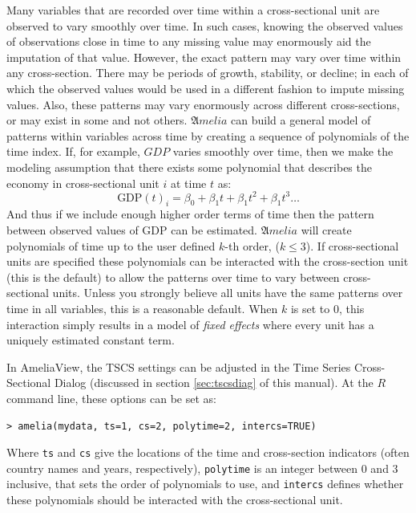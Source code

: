 \documentclass[12pt,titlepage]{article}
\begin{document}
Many variables that are recorded over time within a cross-sectional unit are observed to vary smoothly over time.  In such cases, knowing the observed values of observations close in time to any missing value may enormously aid the imputation of that value.  However, the exact pattern may vary over time within any cross-section.  There may be periods of growth, stability, or decline; in each of which the observed values would be used in a different fashion to impute missing values.  Also, these patterns may vary enormously across different cross-sections, or may exist in some and not others.  ${\mathfrak Amelia}$ can build a general model of patterns within variables across time by creating a sequence of polynomials of the time index.  If, for example, $GDP$ varies smoothly over time, then we make the modeling assumption that there exists some polynomial that describes the economy in cross-sectional unit $i$ at time $t$ as:
\begin{equation}
\textrm{GDP}(t)_i = \beta_0 + \beta_1 t + \beta_1 t^2 + \beta_1 t^3 \ldots
\end{equation}
And thus if we include enough higher order terms of time then the pattern between observed values of GDP can be estimated.  ${\mathfrak Amelia}$ will create polynomials of time up to the user defined $k$-th order, ($k\leq3$).  If cross-sectional units are specified these polynomials can be interacted with the cross-section unit (this is the default) to allow the patterns over time to vary between cross-sectional units.  Unless you strongly believe all units have the same patterns over time in all variables, this is a reasonable default.  When $k$ is set to 0, this interaction simply results in a model of \emph{fixed effects} where every unit has a uniquely estimated constant term.

In AmeliaView, the TSCS settings can be adjusted in the Time Series Cross-Sectional Dialog (discussed in section \ref{sec:tscsdiag} of this manual).  At the $R$ command line, these options can be set as:

\begin{verbatim}> amelia(mydata, ts=1, cs=2, polytime=2, intercs=TRUE)\end{verbatim} 

Where \texttt{ts} and \texttt{cs} give the locations of the time and cross-section indicators (often country names and years, respectively), \texttt{polytime} is an integer between 0 and 3 inclusive, that sets the order of polynomials to use, and \texttt{intercs} defines whether these polynomials should be interacted with the cross-sectional unit.
\end{document}
